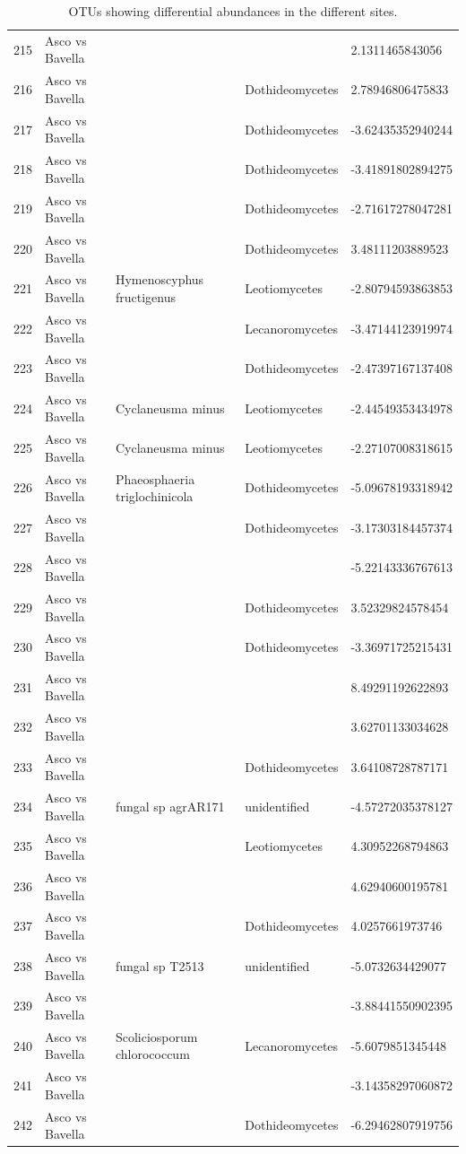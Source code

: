 \documentclass[12pt]{article}\usepackage[]{graphicx}\usepackage[]{color}
\numberwithin{figure}{section}
\begin{document}
\begin{table}[ht]
\begin{tabular}{lllll}
  215 & Asco vs Bavella &  &  & 2.1311465843056 \\ 
  216 & Asco vs Bavella &  & Dothideomycetes & 2.78946806475833 \\ 
  217 & Asco vs Bavella &  & Dothideomycetes & -3.62435352940244 \\ 
  218 & Asco vs Bavella &  & Dothideomycetes & -3.41891802894275 \\ 
  219 & Asco vs Bavella &  & Dothideomycetes & -2.71617278047281 \\ 
  220 & Asco vs Bavella &  & Dothideomycetes & 3.48111203889523 \\ 
  221 & Asco vs Bavella & Hymenoscyphus fructigenus & Leotiomycetes & -2.80794593863853 \\ 
  222 & Asco vs Bavella &  & Lecanoromycetes & -3.47144123919974 \\ 
  223 & Asco vs Bavella &  & Dothideomycetes & -2.47397167137408 \\ 
  224 & Asco vs Bavella & Cyclaneusma minus & Leotiomycetes & -2.44549353434978 \\ 
  225 & Asco vs Bavella & Cyclaneusma minus & Leotiomycetes & -2.27107008318615 \\ 
  226 & Asco vs Bavella & Phaeosphaeria triglochinicola & Dothideomycetes & -5.09678193318942 \\ 
  227 & Asco vs Bavella &  & Dothideomycetes & -3.17303184457374 \\ 
  228 & Asco vs Bavella &  &  & -5.22143336767613 \\ 
  229 & Asco vs Bavella &  & Dothideomycetes & 3.52329824578454 \\ 
  230 & Asco vs Bavella &  & Dothideomycetes & -3.36971725215431 \\ 
  231 & Asco vs Bavella &  &  & 8.49291192622893 \\ 
  232 & Asco vs Bavella &  &  & 3.62701133034628 \\ 
  233 & Asco vs Bavella &  & Dothideomycetes & 3.64108728787171 \\ 
  234 & Asco vs Bavella & fungal sp agrAR171 & unidentified & -4.57272035378127 \\ 
  235 & Asco vs Bavella &  & Leotiomycetes & 4.30952268794863 \\ 
  236 & Asco vs Bavella &  &  & 4.62940600195781 \\ 
  237 & Asco vs Bavella &  & Dothideomycetes & 4.0257661973746 \\ 
  238 & Asco vs Bavella & fungal sp T2513 & unidentified & -5.0732634429077 \\ 
  239 & Asco vs Bavella &  &  & -3.88441550902395 \\ 
  240 & Asco vs Bavella & Scoliciosporum chlorococcum & Lecanoromycetes & -5.6079851345448 \\ 
  241 & Asco vs Bavella &  &  & -3.14358297060872 \\ 
  242 & Asco vs Bavella &  & Dothideomycetes & -6.29462807919756 \\ 
   \hline
\end{tabular}
\endgroup
\caption{OTUs showing differential abundances in the different sites.} 
\end{table}
\end{document}
